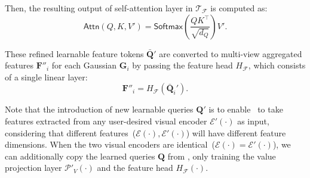 Then, the resulting output of self-attention layer in $\mathcal{T}_\mathcal{F}$ is computed as:
\begin{equation}
    \mathsf{Attn}(Q,K,V') = \mathsf{Softmax}(\frac{QK^\intercal}{\sqrt{d_Q}})V'.
\end{equation}

These refined learnable feature tokens $\bar{\mathbf{Q}}'$ are converted to multi-view aggregated features $\mathbf{F}''_i$ for each Gaussian $\mathbf{G}_i$ by passing the feature head $H_\mathcal{F}$, which consists of a single linear layer:
\begin{equation}
    \mathbf{F}''_i = H_\mathcal{F}(\bar{\mathbf{Q}}_i').
\end{equation}

Note that the introduction of new learnable queries $\mathbf{Q}'$ is to enable \oursF\ to take features extracted from any user-desired visual encoder $\mathcal{E}'(\cdot)$ as input, considering that different features~($\mathcal{E}(\cdot), \mathcal{E}'(\cdot)$) will have different feature dimensions. When the two visual encoders are identical~($\mathcal{E}(\cdot) = \mathcal{E}'(\cdot)$), we can additionally copy the learned queries $\mathbf{Q}$ from \ours, only training the value projection layer $\mathcal{P}'_V(\cdot)$ and the feature head $H_\mathcal{F}(\cdot)$.